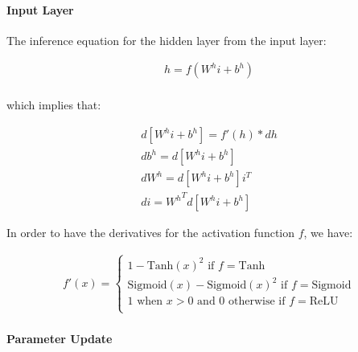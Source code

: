 


\paragraph{Input Layer}

The inference equation for the hidden layer from the input layer:

\begin{equation}
\begin{aligned}
h = f(W^h i + b^h) \\
\label{eq:hidden1}
\end{aligned}  
\end{equation}

which implies that:

\begin{equation}
\begin{aligned}
d[W^h i + b^h] = f'(h) * dh \\
db^h = d[W^h i + b^h] \\
dW^h = d[W^h i + b^h]i^T \\
di = {W^h}^T d[W^h i + b^h]
\label{eq:dhidden}
\end{aligned} 
\end{equation}
%

In order to have the derivatives for the activation function $f$, we have:

\begin{equation}
\begin{aligned}
f'(x) = 
\begin{cases}
1 - \text{Tanh}(x)^2   \text{    if } f = \text{Tanh} \\
\text{Sigmoid}(x) - \text{Sigmoid}(x)^2                \text{     if } f = \text{Sigmoid} \\
1 \text{ when } x > 0 \text{ and 0 otherwise}  \text{     if } f = \text{ReLU} \\
\end{cases}
\label{eq:dactivation}
\end{aligned}
\end{equation}

\paragraph{Parameter Update}


